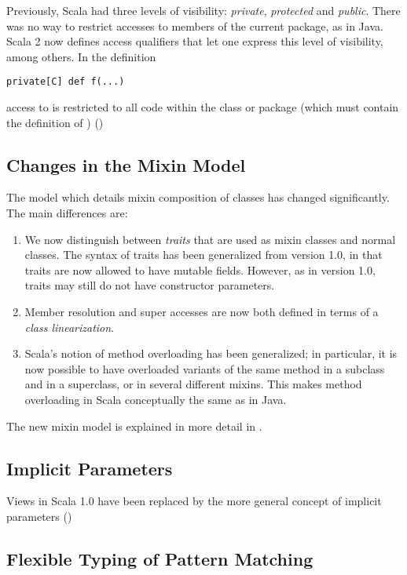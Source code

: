 Previously, Scala had three levels of visibility: {\em private},
{\em protected} and {\em public}. There was no way to
restrict accesses to members of the current package, as in Java. Scala
2 now defines access qualifiers that let one express this level of
visibility, among others. In the definition
\begin{lstlisting}
private[C] def f(...)
\end{lstlisting}
access to \lstinline@f@ is restricted to all code within the class or
package \lstinline@C@ (which must contain the definition of
\lstinline@f@) ()

\subsection*{Changes in the Mixin Model}\label{sec:mixin-classes}

The model which details mixin composition of classes has changed
significantly. The main differences are:
\begin{enumerate}
\item
We now distinguish between {\em traits} that are used as mixin classes
and normal classes. The syntax of traits has been generalized from
version 1.0, in that traits are now allowed to have mutable
fields. However, as in version 1.0, traits may still do not have
constructor parameters.
\item
Member resolution and super accesses are now both defined in terms of
a {\em class linearization}. 
\item
Scala's notion of method overloading has been generalized; in
 particular, it is now possible to have overloaded variants of the
 same method in a subclass and in a superclass, or in several different
 mixins. This makes method overloading in Scala conceptually the
 same as in Java.
\end{enumerate}
The new mixin model is explained in more detail in
.

\subsection*{Implicit Parameters}

Views in Scala 1.0 have been replaced by the more general concept of
implicit parameters ()

\subsection*{Flexible Typing of Pattern Matching}

